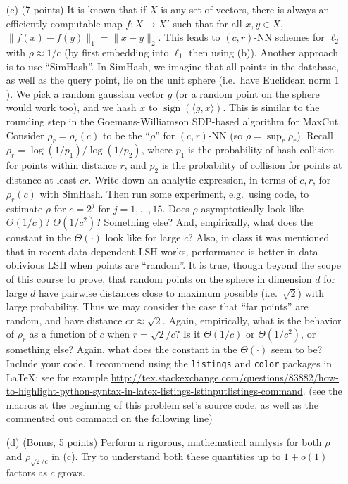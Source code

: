 \documentclass[12pt]{article}
\newcommand\pythonstyle{\lstset{
language=Python,
basicstyle=\ttm,
otherkeywords={self},             %
keywordstyle=\ttb\color{deepblue},
emph={MyClass,__init__},          %
emphstyle=\ttb\color{deepred},    %
stringstyle=\color{deepgreen},
frame=tb,                         %
showstringspaces=false            %
}}
\newcommand\pythonexternal[2][]{{
\pythonstyle
}}
\begin{document}
\begin{itemize}
\item[(c)] (7 points) It is known that if $X$ is any set of vectors, there is always an efficiently computable map $f:X\rightarrow X'$ such that for all $x,y\in X$, $\|f(x) - f(y)\|_1 = \|x - y\|_2$. This leads to $(c,r)$-NN schemes for $\ell_2$ with $\rho \approx 1/c$ (by first embedding into $\ell_1$ then using (b)). Another approach is to use ``SimHash''. In SimHash, we imagine that all points in the database, as well as the query point, lie on the unit sphere (i.e.\ have Euclidean norm $1$). We pick a random gaussian vector $g$ (or a random point on the sphere would work too), and we hash $x$ to $\mathop{sign}(\langle g,x\rangle)$. This is similar to the rounding step in the Goemans-Williamson SDP-based algorithm for \textsf{MaxCut}. Consider $\rho_r = \rho_r(c)$ to be the ``$\rho$'' for $(c,r)$-NN (so $\rho = \sup_r \rho_r$). Recall $\rho_r = \log(1/p_1)/\log(1/p_2)$, where $p_1$ is the probability of hash collision for points within distance $r$, and $p_2$ is the probability of collision for points at distance at least $cr$. Write down an analytic expression, in terms of $c,r$, for $\rho_r(c)$ with SimHash. Then run some experiment, e.g.\ using code, to estimate $\rho$ for $c=2^j$ for $j=1,\ldots,15$. Does $\rho$ asymptotically look like $\Theta(1/c)$? $\Theta(1/c^2)$? Something else? And, empirically, what does the constant in the $\Theta(\cdot)$ look like for large $c$? Also, in class it was mentioned that in recent data-dependent LSH works, performance is better in data-oblivious LSH when points are ``random''. It is true, though beyond the scope of this course to prove, that random points on the sphere in dimension $d$ for large $d$ have pairwise distances close to maximum possible (i.e.\ $\sqrt{2}$) with large probability. Thus we may consider the case that ``far points'' are random, and have distance $cr \approx \sqrt{2}$. Again, empirically, what is the behavior of $\rho_r$ as a function of $c$ when $r = \sqrt{2}/c$? Is it $\Theta(1/c)$ or $\Theta(1/c^2)$, or something else? Again, what does the constant in the $\Theta(\cdot)$ seem to be? Include your code. I recommend using the \texttt{listings} and \texttt{color} packages in \LaTeX; see for example \url{http://tex.stackexchange.com/questions/83882/how-to-highlight-python-syntax-in-latex-listings-lstinputlistings-command}. (see the macros at the beginning of this problem set's source code, as well as the commented out command on the following line)
\item[(d)] (Bonus, 5 points) Perform a rigorous, mathematical analysis for both $\rho$ and $\rho_{\sqrt{2}/c}$ in (c). Try to understand both these quantities up to $1+o(1)$ factors as $c$ grows.
\end{itemize}
\end{document}
